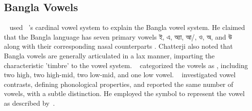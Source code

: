 \subsection{Bangla Vowels}
~\citet{chatterji1921bengali} used ~\citet{jones1922outline}'s cardinal vowel system to explain the Bangla vowel system. He claimed that the Bangla language has seven primary vowels \textbengali{ই}, \textbengali{এ}, \textbengali{অ্যা}, \textbengali{আ}/, \textbengali{ও}, \textbengali{অ}, and \textbengali{উ} along with their corresponding nasal counterparts . Chatterji also noted that Bangla vowels are generally articulated in a lax manner, imparting the characteristic 'timbre' to the vowel system.  ~\citet{morshed1997bhashatatwa} categorized the vowels as , including two high, two high-mid, two low-mid, and one low vowel. ~\citet{ali2001dhanibijnaner} investigated vowel contrasts, defining phonological properties, and reported the same number of vowels, with a subtle distinction. He employed the symbol  to represent the vowel  as described by~\citet{morshed1997bhashatatwa}.

    
        





